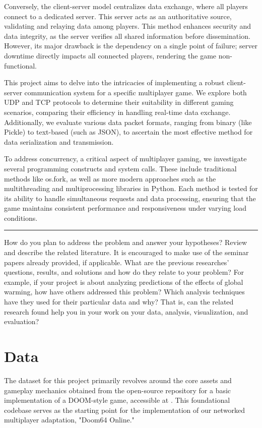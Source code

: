 Conversely, the client-server model \cite{clientserver} centralizes data exchange, where all players connect to a dedicated server. This server acts as an authoritative source, validating and relaying data among players. This method enhances security and data integrity, as the server verifies all shared information before dissemination. However, its major drawback is the dependency on a single point of failure; server downtime directly impacts all connected players, rendering the game non-functional.

This project aims to delve into the intricacies of implementing a robust client-server communication system for a specific multiplayer game. We explore both UDP and TCP protocols to determine their suitability in different gaming scenarios, comparing their efficiency in handling real-time data exchange. Additionally, we evaluate various data packet formats, ranging from binary (like Pickle) to text-based (such as JSON), to ascertain the most effective method for data serialization and transmission.

To address concurrency, a critical aspect of multiplayer gaming, we investigate several programming constructs and system calls. These include traditional methods like os.fork, as well as more modern approaches such as the multithreading and multiprocessing libraries in Python. Each method is tested for its ability to handle simultaneous requests and data processing, ensuring that the game maintains consistent performance and responsiveness under varying load conditions.
\hrule
How do you plan to address the problem and answer your hypotheses? Review and describe the related literature. It is encouraged to make use of the seminar papers already provided, if applicable. What are the previous researches’ questions, results, and solutions and how do they relate to your problem? For example, if your project is about analyzing predictions of the effects of global warming, how have others addressed this problem? Which analysis techniques have they used for their particular data and why? That is, can the related research found help you in your work on your data, analysis, visualization, and evaluation?


\section{Data}
\label{chap:data}

The dataset for this project primarily revolves around the core assets and gameplay mechanics obtained from the open-source repository for a basic implementation of a DOOM-style game, accessible at \cite{doom-repo}. This foundational codebase serves as the starting point for the implementation of our networked multiplayer adaptation, "Doom64 Online."

